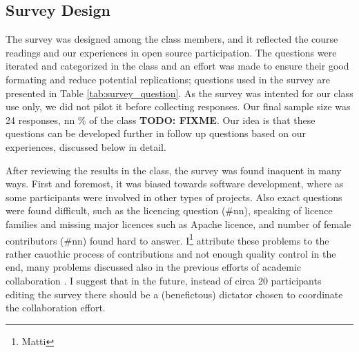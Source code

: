 \subsection{Survey Design}

The survey was designed  among the class members, and it reflected the course readings and our experiences in open source participation. The questions were iterated and categorized in the class and an effort was made to ensure their good formating and reduce potential replications; questions used in the survey are presented in Table \ref{tab:survey_question}. As the survey was intented for our class use only, we did not pilot it before collecting responses. Our final sample size was 24 responses, nn \% of the class \textbf{TODO: FIXME}. Our idea is that these questions can be developed further in follow up questions based on our experiences, discussed below in detail.


After reviewing the results in the class, the survey was found inaquent in many ways. First and foremost, it was biased towards software development, where as some participants were involved in other types of projects. Also exact questions were found difficult, such as the licencing question (#nn), speaking of licence families and missing major licences such as Apache licence, and number of female contributors (#nn) found hard to answer. I\footnote{Matti} attribute these problems to the rather cauothic process of contributions and not enough quality control in the end, many problems discussed also in the previous efforts of academic collaboration \cite{Tomlinson2012}. I suggest that in the future, instead of circa 20 participants editing the survey there should be a (benefictous) dictator chosen to coordinate the collaboration effort.


